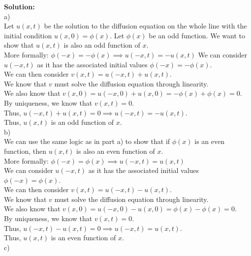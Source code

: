 \documentclass[answers,12pt,addpoints]{exam}
\begin{document}
\begin{questions}
    \textbf{Solution:}\\
    a) \\
    Let $u(x, t)$ be the solution to the diffusion equation on the whole line with the initial condition $u(x, 0) = \phi(x)$. Let $\phi(x)$ be an odd function. We want to show that $u(x, t)$ is also an odd function of $x$.\\
    More formally: $\phi(-x) = -\phi(x) \implies u(-x,t) = -u(x,t)$ 
    We can consider $u(-x,t)$ as it has the associated initial values $\phi(-x) = -\phi(x)$.\\
    We can then consider $v(x,t) = u(-x,t) + u(x,t)$.\\ 
    We know that $v$ must solve the diffusion equation through linearity.\\
    We also know that $v(x,0) = u(-x,0) + u(x,0) = -\phi(x) + \phi(x) = 0$.\\
    By uniqueness, we know that $v(x,t) = 0$.\\
    Thus, $u(-x,t) + u(x,t) = 0 \implies u(-x,t) = -u(x,t)$.\\
    Thus, $u(x,t)$ is an odd function of $x$.\\
    b) \\
    We can use the same logic as in part a) to show that if $\phi(x)$ is an even function, then $u(x,t)$ is also an even function of $x$.\\
    More formally: $\phi(-x) = \phi(x) \implies u(-x,t) = u(x,t)$\\
    We can consider $u(-x,t)$ as it has the associated initial values $\phi(-x) = \phi(x)$.\\
    We can then consider $v(x,t) = u(-x,t) - u(x,t)$.\\
    We know that $v$ must solve the diffusion equation through linearity.\\
    We also know that $v(x,0) = u(-x,0) - u(x,0) = \phi(x) - \phi(x) = 0$.\\
    By uniqueness, we know that $v(x,t) = 0$.\\
    Thus, $u(-x,t) - u(x,t) = 0 \implies u(-x,t) = u(x,t)$.\\
    Thus, $u(x,t)$ is an even function of $x$.\\
    c) \\

\end{questions}
\end{document}
